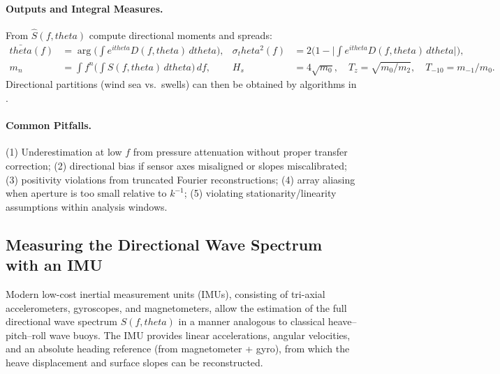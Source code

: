 \documentclass[journal,10pt,twocolumn]{IEEEtran}
\def\theta{theta}%
\def\mathrm#1{#1}%
\begin{document}
    \paragraph{Outputs and Integral Measures.}
    From $\widehat{S}(f,\theta)$ compute directional moments and spreads:
    \begin{align}
        \bar{\theta}(f) &= \arg\!\Big(\int e^{\mathrm{i}\theta} D(f,\theta)\, d\theta\Big),
        &
        \sigma_\theta^2(f) &= 2\Big(1-\big|\int e^{\mathrm{i}\theta} D(f,\theta)\, d\theta\big|\Big),\\
        m_n &= \int f^n \bigg(\int S(f,\theta)\,d\theta\bigg)\, df,
        &
        H_s &= 4\sqrt{m_0},\quad T_z=\sqrt{m_0/m_2},\quad T_{-10}=m_{-1}/m_0.
    \end{align}
    Directional partitions (wind sea vs.\ swells) can then be obtained by algorithms in .

    \paragraph{Common Pitfalls.}
    (1) Underestimation at low $f$ from pressure attenuation without proper transfer correction; (2) directional bias if sensor axes misaligned or slopes miscalibrated; (3) positivity violations from truncated Fourier reconstructions; (4) array aliasing when aperture is too small relative to $k^{-1}$; (5) violating stationarity/linearity assumptions within analysis windows.

    \subsection{Measuring the Directional Wave Spectrum with an IMU}
    \label{subsec:imu-directional-spectrum}

    Modern low-cost inertial measurement units (IMUs), consisting of tri-axial accelerometers, gyroscopes, and magnetometers, allow the estimation of the full directional wave spectrum $S(f,\theta)$ in a manner analogous to classical heave--pitch--roll wave buoys. The IMU provides linear accelerations, angular velocities, and an absolute heading reference (from magnetometer + gyro), from which the heave displacement and surface slopes can be reconstructed.
\end{document}

